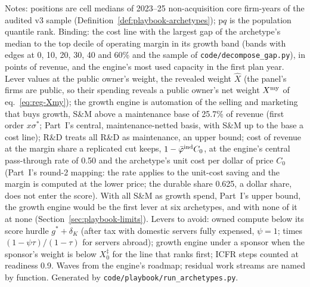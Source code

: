 \begin{table}[p]
\smallskip
\begin{minipage}{0.98\linewidth}\scriptsize
Notes: positions are cell medians of 2023--25 non-acquisition core firm-years of the audited v3 sample (Definition~\ref{def:playbook-archetypes}); p$q$ is the population quantile rank. Binding: the cost line with the largest gap of the archetype's median to the top decile of operating margin in its growth band (bands with edges at 0, 10, 20, 30, 40 and 60\% and the sample of \texttt{code/decompose\_gap.py}), in points of revenue, and the engine's most used capacity in the first plan year. Lever values at the public owner's weight, the revealed weight $\hat X$ (the panel's firms are public, so their spending reveals a public owner's net weight $X^{\rm my}$ of eq.~\eqref{eq:reg-Xmy}); the growth engine is automation of the selling and marketing that buys growth, S\&M above a maintenance base of 25.7\% of revenue (first order $x\sigma^*$; Part~I's central, maintenance-netted basis, with S\&M up to the base a cost line); R\&D treats all R\&D as maintenance, an upper bound; cost of revenue at the margin share a replicated cut keeps, $1-\bar\varphi^{\rm ind}C_0$, at the engine's central pass-through rate of 0.50 and the archetype's unit cost per dollar of price $C_0$ (Part~I's round-2 mapping: the rate applies to the unit-cost saving and the margin is computed at the lower price; the durable share 0.625, a dollar share, does not enter the score). With all S\&M as growth spend, Part~I's upper bound, the growth engine would be the first lever at six archetypes, and with none of it at none (Section~\ref{sec:playbook-limits}). Levers to avoid: owned compute below its score hurdle $g^*+\delta_K$ (after tax with domestic servers fully expensed, $\psi=1$; times $(1-\psi\tau)/(1-\tau)$ for servers abroad); growth engine under a sponsor when the sponsor's weight is below $X^\ddagger_0$ for the line that ranks first; ICFR steps counted at readiness 0.9. Waves from the engine's roadmap; residual work streams are named by function. Generated by \texttt{code/playbook/run\_archetypes.py}.
\end{minipage}
\end{table}
